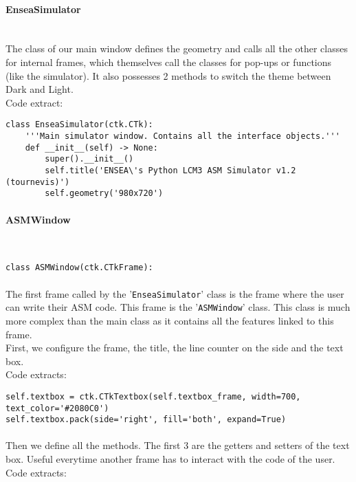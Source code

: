 \documentclass{article}
\newcommand{\code}[1]{\fontfamily{zi4}\texttt{#1}}
\newcommand{\subsubsubsection}[1]{\paragraph{#1}\mbox{}\\}
\begin{document}
\subsubsubsection{EnseaSimulator}

The class of our main window defines the geometry and calls all the other classes for internal frames, which themselves call the classes for pop-ups or functions (like the simulator). It also possesses 2 methods to switch the theme between Dark and Light. \\
Code extract: \\

\begin{lstlisting}[language=MyPython]
class EnseaSimulator(ctk.CTk):
    '''Main simulator window. Contains all the interface objects.'''
    def __init__(self) -> None:        
        super().__init__()
        self.title('ENSEA\'s Python LCM3 ASM Simulator v1.2 (tournevis)')
        self.geometry('980x720')
\end{lstlisting}
\paragraph{}
\subsubsubsection{ASMWindow}
\begin{lstlisting}[language=MyPython]
class ASMWindow(ctk.CTkFrame):
\end{lstlisting}
\paragraph{}

The first frame called by the '\code{EnseaSimulator}' class is the frame where the user can write their ASM code. This frame is the '\code{ASMWindow}' class. This class is much more complex than the main class as it contains all the features linked to this frame. \\
First, we configure the frame, the title, the line counter on the side and the text box. \\
Code extracts:  \\

\begin{lstlisting}[language=MyPython]
self.textbox = ctk.CTkTextbox(self.textbox_frame, width=700, text_color='#2080C0')
self.textbox.pack(side='right', fill='both', expand=True)
\end{lstlisting}
\paragraph{}

Then we define all the methods. The first 3 are the getters and setters of the text box. Useful everytime another frame has to interact with the code of the user. \\
Code extracts: \\
\end{document}
